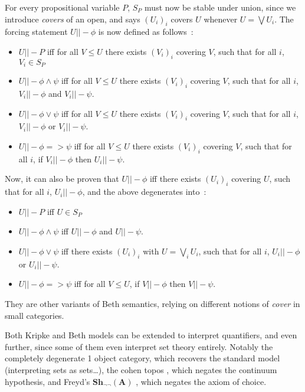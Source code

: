 \documentclass[11pt]{article}
\newcommand{\0}{\mathbf{0}}
\newcommand{\1}{\mathbf{1}}
\begin{document}
For every propositional variable $P$, $S_P$ must now be stable under union, since we introduce \emph{covers} of an open, and says $(U_i)_i$ covers $U$ whenever $U = \bigvee U_i$. The forcing statement $U ||- \phi$ is now defined as follows~:
\begin{itemize}
    \item $U ||- P$ iff for all $V \leq U$ there exists $(V_i)_i$ covering $V$, such that for all $i$, $V_i \in S_P$
    \item $U ||- \phi \wedge \psi$ iff for all $V \leq U$ there exists $(V_i)_i$ covering $V$, such that for all $i$, $V_i ||- \phi$ and $V_i ||- \psi $.
    \item $U ||- \phi \vee \psi $ iff for all $V \leq U$ there exists $(V_i)_i$ covering $V$, such that for all $i$, $V_i ||- \phi$ or $V_i ||- \psi $.
    \item $U ||- \phi => \psi $ iff for all $V \leq U$ there exists $(V_i)_i$ covering $V$, such that for all $i$, if $V_i ||- \phi$ then $U_i ||- \psi $.
\end{itemize}

Now, it can also be proven that $U ||- \phi$ iff there exists $(U_i)_i$ covering $U$, such that for all $i$, $U_i||- \phi$, and the above degenerates into~:
\begin{itemize}
    \item $U ||- P$ iff $U \in S_P$
    \item $U ||- \phi \wedge \psi$ iff $U ||- \phi$ and $U ||- \psi $.
    \item $U ||- \phi \vee \psi $ iff there exists $(U_i)_i$ with $U = \bigvee_i U_i$, such that for all $i$, $U_i ||- \phi$ or $U_i ||- \psi $.
    \item $U ||- \phi => \psi $ iff for all $V \leq U$, if $V ||- \phi$ then $V ||- \psi $.
\end{itemize}

They are other variants of Beth semantics, relying on different notions of \emph{cover} in small categories.

Both Kripke and Beth models can be extended to interpret quantifiers, and even further, since some of them even interpret set theory entirely.
Notably the completely degenerate 1 object category, which recovers the standard model (interpreting sets as sets\dots), the cohen topos \cite{maclane2012sheaves}, which negates the continuum hypothesis, and Freyd's $\mathbf{Sh}_{\lnot\lnot}(\mathbf{A})$ \cite{maclane2012sheaves}\cite{FREYD1980103}, which negates the axiom of choice.
\end{document}
